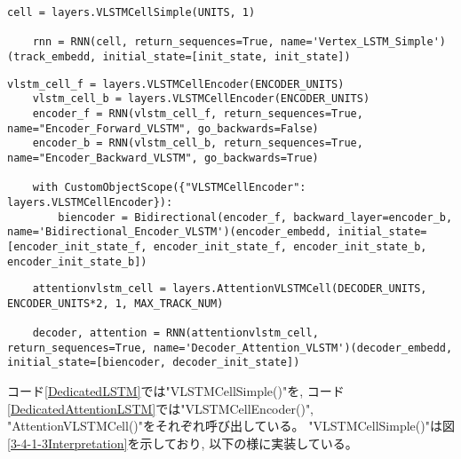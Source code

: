 \begin{lstlisting}[caption=独自のLSTM]
    cell = layers.VLSTMCellSimple(UNITS, 1)

    rnn = RNN(cell, return_sequences=True, name='Vertex_LSTM_Simple')(track_embedd, initial_state=[init_state, init_state])
\end{lstlisting}
\begin{lstlisting}[caption=独自のAttention LSTM]
    vlstm_cell_f = layers.VLSTMCellEncoder(ENCODER_UNITS)
    vlstm_cell_b = layers.VLSTMCellEncoder(ENCODER_UNITS)
    encoder_f = RNN(vlstm_cell_f, return_sequences=True, name="Encoder_Forward_VLSTM", go_backwards=False)
    encoder_b = RNN(vlstm_cell_b, return_sequences=True, name="Encoder_Backward_VLSTM", go_backwards=True)

    with CustomObjectScope({"VLSTMCellEncoder": layers.VLSTMCellEncoder}):
        biencoder = Bidirectional(encoder_f, backward_layer=encoder_b, name='Bidirectional_Encoder_VLSTM')(encoder_embedd, initial_state=[encoder_init_state_f, encoder_init_state_f, encoder_init_state_b, encoder_init_state_b])
\end{lstlisting}
\begin{lstlisting}
    attentionvlstm_cell = layers.AttentionVLSTMCell(DECODER_UNITS, ENCODER_UNITS*2, 1, MAX_TRACK_NUM)
    
    decoder, attention = RNN(attentionvlstm_cell, return_sequences=True, name='Decoder_Attention_VLSTM')(decoder_embedd, initial_state=[biencoder, decoder_init_state])
\end{lstlisting}

コード\ref{DedicatedLSTM}では"VLSTMCellSimple()"を, コード\ref{DedicatedAttentionLSTM}では"VLSTMCellEncoder()", "AttentionVLSTMCell()"をそれぞれ呼び出している。
"VLSTMCellSimple()"は図\ref{3-4-1-3Interpretation}を示しており, 以下の様に実装している。

